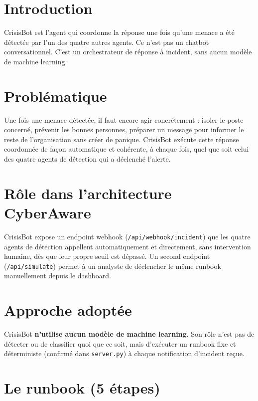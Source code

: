 \documentclass[12pt,a4paper]{report}
\begin{document}
\section{Introduction}

CrisisBot est l'agent qui coordonne la réponse une fois qu'une menace a été détectée par l'un des quatre autres agents. Ce n'est pas un chatbot conversationnel. C'est un orchestrateur de réponse à incident, sans aucun modèle de machine learning.

\section{Problématique}

Une fois une menace détectée, il faut encore agir concrètement : isoler le poste concerné, prévenir les bonnes personnes, préparer un message pour informer le reste de l'organisation sans créer de panique. CrisisBot exécute cette réponse coordonnée de façon automatique et cohérente, à chaque fois, quel que soit celui des quatre agents de détection qui a déclenché l'alerte.

\section{Rôle dans l'architecture CyberAware}

CrisisBot expose un endpoint webhook (\texttt{/api/webhook/incident}) que les quatre agents de détection appellent automatiquement et directement, sans intervention humaine, dès que leur propre seuil est dépassé. Un second endpoint (\texttt{/api/simulate}) permet à un analyste de déclencher le même runbook manuellement depuis le dashboard.

\section{Approche adoptée}

CrisisBot \textbf{n'utilise aucun modèle de machine learning}. Son rôle n'est pas de détecter ou de classifier quoi que ce soit, mais d'exécuter un runbook fixe et déterministe (confirmé dans \texttt{server.py}) à chaque notification d'incident reçue.

\section{Le runbook (5 étapes)}
\end{document}
